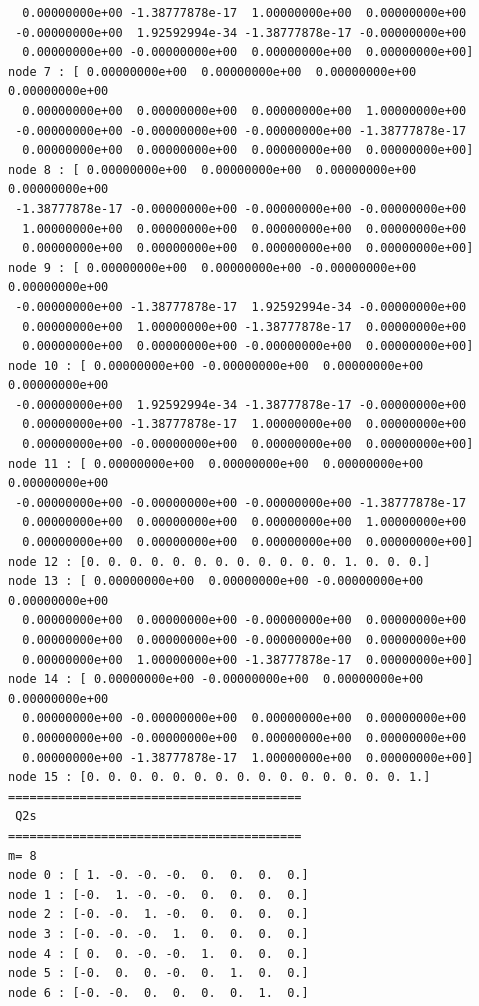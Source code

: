 \begin{scriptsize}
\begin{verbatim}
  0.00000000e+00 -1.38777878e-17  1.00000000e+00  0.00000000e+00
 -0.00000000e+00  1.92592994e-34 -1.38777878e-17 -0.00000000e+00
  0.00000000e+00 -0.00000000e+00  0.00000000e+00  0.00000000e+00]
node 7 : [ 0.00000000e+00  0.00000000e+00  0.00000000e+00  0.00000000e+00
  0.00000000e+00  0.00000000e+00  0.00000000e+00  1.00000000e+00
 -0.00000000e+00 -0.00000000e+00 -0.00000000e+00 -1.38777878e-17
  0.00000000e+00  0.00000000e+00  0.00000000e+00  0.00000000e+00]
node 8 : [ 0.00000000e+00  0.00000000e+00  0.00000000e+00  0.00000000e+00
 -1.38777878e-17 -0.00000000e+00 -0.00000000e+00 -0.00000000e+00
  1.00000000e+00  0.00000000e+00  0.00000000e+00  0.00000000e+00
  0.00000000e+00  0.00000000e+00  0.00000000e+00  0.00000000e+00]
node 9 : [ 0.00000000e+00  0.00000000e+00 -0.00000000e+00  0.00000000e+00
 -0.00000000e+00 -1.38777878e-17  1.92592994e-34 -0.00000000e+00
  0.00000000e+00  1.00000000e+00 -1.38777878e-17  0.00000000e+00
  0.00000000e+00  0.00000000e+00 -0.00000000e+00  0.00000000e+00]
node 10 : [ 0.00000000e+00 -0.00000000e+00  0.00000000e+00  0.00000000e+00
 -0.00000000e+00  1.92592994e-34 -1.38777878e-17 -0.00000000e+00
  0.00000000e+00 -1.38777878e-17  1.00000000e+00  0.00000000e+00
  0.00000000e+00 -0.00000000e+00  0.00000000e+00  0.00000000e+00]
node 11 : [ 0.00000000e+00  0.00000000e+00  0.00000000e+00  0.00000000e+00
 -0.00000000e+00 -0.00000000e+00 -0.00000000e+00 -1.38777878e-17
  0.00000000e+00  0.00000000e+00  0.00000000e+00  1.00000000e+00
  0.00000000e+00  0.00000000e+00  0.00000000e+00  0.00000000e+00]
node 12 : [0. 0. 0. 0. 0. 0. 0. 0. 0. 0. 0. 0. 1. 0. 0. 0.]
node 13 : [ 0.00000000e+00  0.00000000e+00 -0.00000000e+00  0.00000000e+00
  0.00000000e+00  0.00000000e+00 -0.00000000e+00  0.00000000e+00
  0.00000000e+00  0.00000000e+00 -0.00000000e+00  0.00000000e+00
  0.00000000e+00  1.00000000e+00 -1.38777878e-17  0.00000000e+00]
node 14 : [ 0.00000000e+00 -0.00000000e+00  0.00000000e+00  0.00000000e+00
  0.00000000e+00 -0.00000000e+00  0.00000000e+00  0.00000000e+00
  0.00000000e+00 -0.00000000e+00  0.00000000e+00  0.00000000e+00
  0.00000000e+00 -1.38777878e-17  1.00000000e+00  0.00000000e+00]
node 15 : [0. 0. 0. 0. 0. 0. 0. 0. 0. 0. 0. 0. 0. 0. 0. 1.]
=========================================
 Q2s
=========================================
m= 8
node 0 : [ 1. -0. -0. -0.  0.  0.  0.  0.]
node 1 : [-0.  1. -0. -0.  0.  0.  0.  0.]
node 2 : [-0. -0.  1. -0.  0.  0.  0.  0.]
node 3 : [-0. -0. -0.  1.  0.  0.  0.  0.]
node 4 : [ 0.  0. -0. -0.  1.  0.  0.  0.]
node 5 : [-0.  0.  0. -0.  0.  1.  0.  0.]
node 6 : [-0. -0.  0.  0.  0.  0.  1.  0.]

\end{verbatim}
\end{scriptsize}
